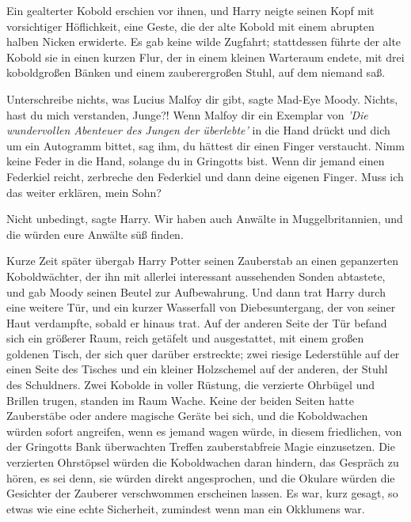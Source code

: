Ein gealterter Kobold erschien vor ihnen, und Harry neigte seinen Kopf mit
vorsichtiger Höflichkeit, eine Geste, die der alte Kobold mit einem abrupten
halben Nicken erwiderte. Es gab keine wilde Zugfahrt; stattdessen führte der
alte Kobold sie in einen kurzen Flur, der in einem kleinen Warteraum endete, mit
drei koboldgroßen Bänken und einem zauberergroßen Stuhl, auf dem niemand saß.

\glqq{}Unterschreibe nichts, was Lucius Malfoy dir gibt\grqq{}, sagte Mad-Eye
Moody. \glqq{}Nichts, hast du mich verstanden, Junge?! Wenn Malfoy dir ein
Exemplar von\emph{ 'Die wundervollen Abenteuer des Jungen der überlebte'} in die
Hand drückt und dich um ein Autogramm bittet, sag ihm, du hättest dir einen
Finger verstaucht. Nimm keine Feder in die Hand, solange du in Gringotts bist.
Wenn dir jemand einen Federkiel reicht, zerbreche den Federkiel und dann deine
eigenen Finger. Muss ich das weiter erklären, mein Sohn?\grqq{}

\glqq{}Nicht unbedingt\grqq{}, sagte Harry. \glqq{}Wir haben auch Anwälte in
Muggelbritannien, und die würden eure Anwälte süß finden.\grqq{}

Kurze Zeit später übergab Harry Potter seinen Zauberstab an einen gepanzerten
Koboldwächter, der ihn mit allerlei interessant aussehenden Sonden abtastete,
und gab Moody seinen Beutel zur Aufbewahrung. Und dann trat Harry durch eine
weitere Tür, und ein kurzer Wasserfall von Diebesuntergang, der von seiner Haut
verdampfte, sobald er hinaus trat. Auf der anderen Seite der Tür befand sich ein
größerer Raum, reich getäfelt und ausgestattet, mit einem großen goldenen Tisch,
der sich quer darüber erstreckte; zwei riesige Lederstühle auf der einen Seite
des Tisches und ein kleiner Holzschemel auf der anderen, der Stuhl des
Schuldners. Zwei Kobolde in voller Rüstung, die verzierte Ohrbügel und Brillen
trugen, standen im Raum Wache. Keine der beiden Seiten hatte Zauberstäbe oder
andere magische Geräte bei sich, und die Koboldwachen würden sofort angreifen,
wenn es jemand wagen würde, in diesem friedlichen, von der Gringotts Bank
überwachten Treffen zauberstabfreie Magie einzusetzen. Die verzierten Ohrstöpsel
würden die Koboldwachen daran hindern, das Gespräch zu hören, es sei denn, sie
würden direkt angesprochen, und die Okulare würden die Gesichter der Zauberer
verschwommen erscheinen lassen. Es war, kurz gesagt, so etwas wie eine echte
Sicherheit, zumindest wenn man ein Okklumens war.

